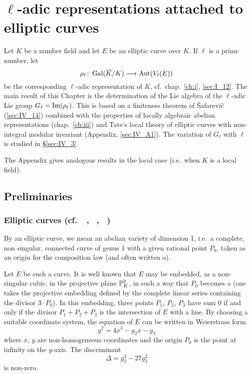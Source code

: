 \chapter{\texorpdfstring{$\ell$}{ℓ}-adic representations attached to elliptic
curves}\label{ch:iv}

Let $K$ be a number field and let $E$ be an elliptic curve over $K$.
\dpage
If $\ell$ is a prime number, let
\[
	\rho_\ell \colon \operatorname{Gal}(\overline{K}/K) \longrightarrow \operatorname{Aut}(V_\ell(E))
\]
be the corresponding $\ell$-adic representation of $K$, cf.\ chap.~\ref{ch:i},
\ref{sec:I_12}.  The main result of this Chapter is the determination of the
Lie algebra of the $\ell$-adic Lie group $G_\ell = \operatorname{Im}(\rho_\ell)$. This is
based on a finiteness theorem of \v Safarevi\v c (\ref{sec:IV_14}) combined
with the properties of locally algebraic abelian representations
(chap.~\ref{ch:iii}) and Tate's local theory of elliptic curves with
non-integral modular invariant (Appendix, \ref{sec:IV_A1}). The variation of
$G_\ell$ with $\ell$ is studied in \S\ref{sec:IV_3}.

The Appendix gives analogous results in the local case (i.e.\ when $K$ is a
local field).

\section{Preliminaries}%
\dpage

\subsection[Elliptic curves]{Elliptic curves \textmd{(cf.\
\citeauthor{5}~\cite{5}, \citeauthor{9}~\cite{9}, \citeauthor{10}~\cite{10})}}
\label{sec:IV_11}
By an elliptic curve, we mean an abelian variety of dimension
1, i.e.\ a complete, non singular, connected curve of genus 1 with a
given rational point $P_0$, taken as an origin for the composition law
(and often written $o$).

Let $E$ be such a curve. It is well known that $E$ may be embedded, as a
non-singular cubic, in the projective plane $\mathbb{P}^2_K$, in such a way that $P_0$
becomes a \textquote{flex} (one takes the projective embedding defined by the
complete linear series containing the divisor $3\cdot P_0$). In this embedding,
three points $P_1$, $P_2$, $P_3$ have sum $0$ if and only if the divisor $P_1 +
P_2 + P_3$ is the intersection of $E$ with a line. By choosing a suitable
coordinate system, the equation of $E$ can be written in Weierstrass form
\[
	y^2 = 4x^3 - g_2x - g_3
\]
where $x$, $y$ are non-homogeneous coordinates and the origin $P_0$ is
the point at infinity on the $y$-axis. The discriminant
\[
	\Delta = g_2^3 - 27g_3^2
\]
is non-zero.

